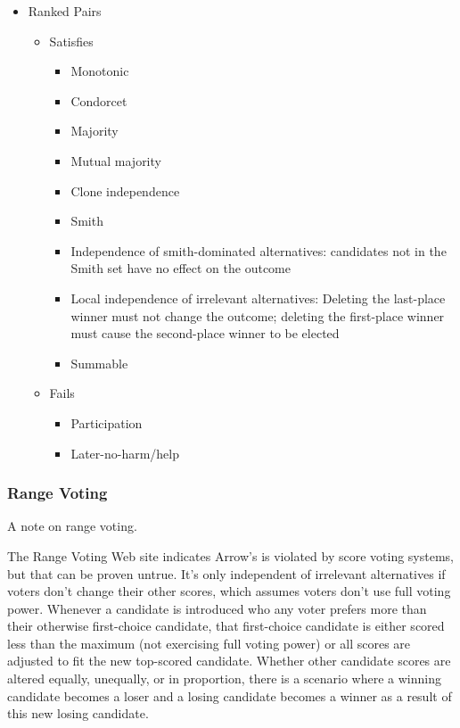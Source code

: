 \begin{itemize}
    \item Ranked Pairs
    \begin{itemize}
        \item Satisfies
        \begin{itemize}
            \item Monotonic
            \item Condorcet
            \item Majority
            \item Mutual majority
            \item Clone independence
            \item Smith
            \item Independence of smith-dominated alternatives:  candidates not in the Smith set have no effect on the outcome
            \item Local independence of irrelevant alternatives:  Deleting the last-place winner must not change the outcome; deleting the first-place winner must cause the second-place winner to be elected
            \item Summable
        \end{itemize}

        \item Fails
        \begin{itemize}
            \item Participation
            \item Later-no-harm/help
        \end{itemize}
    \end{itemize}
\end{itemize}

\subsubsection{Range Voting}

A note on range voting.

The Range Voting Web site indicates Arrow's is violated by score voting systems, but that can be proven untrue.  It's only independent of irrelevant alternatives if voters don't change their other scores, which assumes voters don't use full voting power.  Whenever a candidate is introduced who any voter prefers more than their otherwise first-choice candidate, that first-choice candidate is either scored less than the maximum (not exercising full voting power) or all scores are adjusted to fit the new top-scored candidate.  Whether other candidate scores are altered equally, unequally, or in proportion, there is a scenario where a winning candidate becomes a loser and a losing candidate becomes a winner as a result of this new losing candidate.

